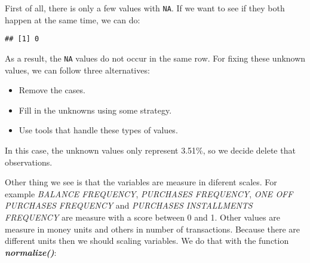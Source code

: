 \documentclass[11pt,]{article}
\newenvironment{Shaded}{\begin{snugshade}}{\end{snugshade}}
\newcommand{\KeywordTok}[1]{\textcolor[rgb]{0.13,0.29,0.53}{\textbf{#1}}}
\newcommand{\StringTok}[1]{\textcolor[rgb]{0.31,0.60,0.02}{#1}}
\newcommand{\OperatorTok}[1]{\textcolor[rgb]{0.81,0.36,0.00}{\textbf{#1}}}
\newcommand{\NormalTok}[1]{#1}
\begin{document}
First of all, there is only a few values with \texttt{NA}. If we want to
see if they both happen at the same time, we can do:

\begin{Shaded}
\end{Shaded}

\begin{verbatim}
## [1] 0
\end{verbatim}

As a result, the \texttt{NA} values do not occur in the same row. For
fixing these unknown values, we can follow three alternatives:

\begin{itemize}
\item
  Remove the cases.
\item
  Fill in the unknowns using some strategy.
\item
  Use tools that handle these types of values.
\end{itemize}

In this case, the unknown values only represent 3.51\%, so we decide
delete that observations.

\begin{Shaded}
\end{Shaded}

Other thing we see is that the variables are measure in diferent scales.
For example \emph{BALANCE FREQUENCY}, \emph{PURCHASES FREQUENCY},
\emph{ONE OFF PURCHASES FREQUENCY} and \emph{PURCHASES INSTALLMENTS
FREQUENCY} are measure with a score between 0 and 1. Other values are
measure in money units and others in number of transactions. Because
there are different units then we should scaling variables. We do that
with the function \emph{\textbf{normalize()}}:
\end{document}
